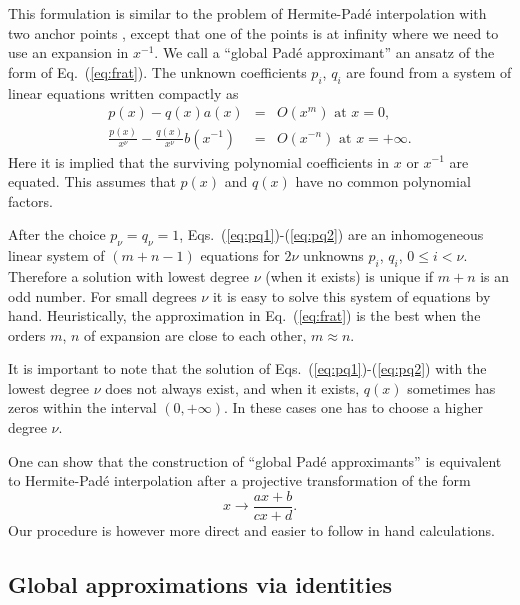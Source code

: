 \documentclass{llncs}
\begin{document}
This formulation is similar to the problem of Hermite-Pad\'e interpolation
with two anchor points \cite{GG99}, except that one of the points
is at infinity where we need to use an expansion in $x^{-1}$. We
call a {}``global Pad\'e approximant'' an ansatz of the form of Eq.~(\ref{eq:frat}).
The unknown coefficients $p_{i}$, $q_{i}$ are found from a system
of linear equations written compactly as\begin{eqnarray}
p\left(x\right)-q\left(x\right)a\left(x\right) & = & O\left(x^{m}\right)\textrm{ at }x=0,\label{eq:pq1}\\
\frac{p\left(x\right)}{x^{\nu }}-\frac{q\left(x\right)}{x^{\nu }}b\left(x^{-1}\right) & = & O\left(x^{-n}\right)\textrm{ at }x=+\infty .\label{eq:pq2}
\end{eqnarray}
 Here it is implied that the surviving polynomial coefficients in
$x$ or $x^{-1}$ are equated. This assumes that $p\left(x\right)$
and $q\left(x\right)$ have no common polynomial factors.

After the choice $p_{\nu }=q_{\nu }=1$, Eqs.~(\ref{eq:pq1})-(\ref{eq:pq2})
are an inhomogeneous linear system of $\left(m+n-1\right)$ equations
for $2\nu $ unknowns $p_{i}$, $q_{i}$, $0\leq i<\nu $. Therefore
a solution with lowest degree $\nu $ (when it exists) is unique if
$m+n$ is an odd number. For small degrees $\nu $ it is easy to solve
this system of equations by hand. Heuristically, the approximation
in Eq.~(\ref{eq:frat}) is the best when the orders $m$, $n$ of
expansion are close to each other, $m\approx n$.

It is important to note that the solution of Eqs.~(\ref{eq:pq1})-(\ref{eq:pq2})
with the lowest degree $\nu $ does not always exist, and when it
exists, $q\left(x\right)$ sometimes has zeros within the interval
$\left(0,+\infty \right)$. In these cases one has to choose a higher
degree $\nu $.

One can show that the construction of {}``global Pad\'e approximants''
is equivalent to Hermite-Pad\'e interpolation after a projective transformation
of the form\begin{equation}
x\rightarrow \frac{ax+b}{cx+d}.\end{equation}
Our procedure is however more direct and easier to follow in hand
calculations.


\subsection{Global approximations via identities}
\end{document}
